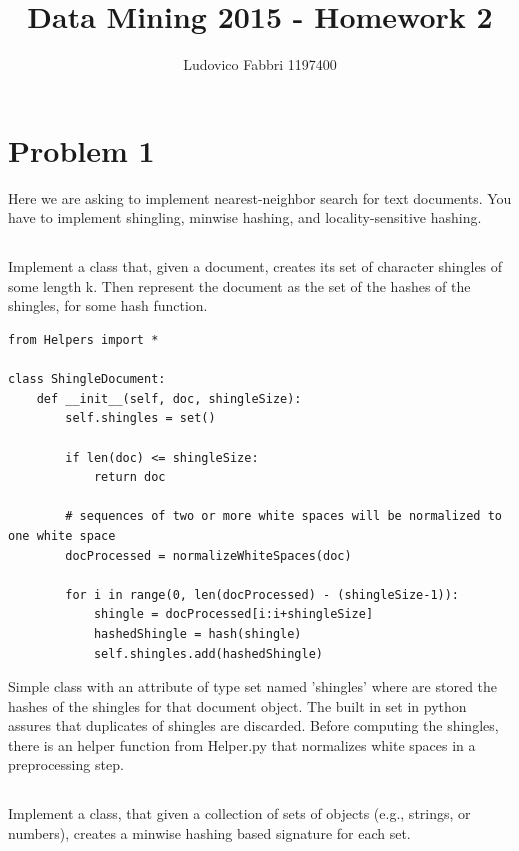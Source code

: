 \documentclass{article}
\begin{document}
\raggedright

\doublespacing


\title{ {\Huge{Data Mining 2015 - Homework 2}} }
\author {Ludovico Fabbri 1197400}
\maketitle


\section{Problem 1}
Here we are asking to implement nearest-neighbor search for text documents. You have to implement shingling, minwise hashing, and locality-sensitive hashing. 

\subsection{}
Implement a class that, given a document, creates its set of character shingles of some length k. Then represent the document as the set of the hashes of the shingles, for some hash function.

\begin{lstlisting} 
from Helpers import *

class ShingleDocument:
    def __init__(self, doc, shingleSize):
        self.shingles = set()

        if len(doc) <= shingleSize:
            return doc

        # sequences of two or more white spaces will be normalized to one white space
        docProcessed = normalizeWhiteSpaces(doc)

        for i in range(0, len(docProcessed) - (shingleSize-1)):
            shingle = docProcessed[i:i+shingleSize]
            hashedShingle = hash(shingle)
            self.shingles.add(hashedShingle)
\end{lstlisting}

Simple class with an attribute of type set named 'shingles' where are stored the hashes of the shingles for that document object. The built in set in python assures that duplicates of shingles are discarded. Before computing the shingles, there is an helper function from Helper.py that normalizes white spaces in a preprocessing step.



\subsection{}
Implement a class, that given a collection of sets of objects (e.g., strings, or numbers), creates a minwise hashing based signature for each set.
\end{document}
